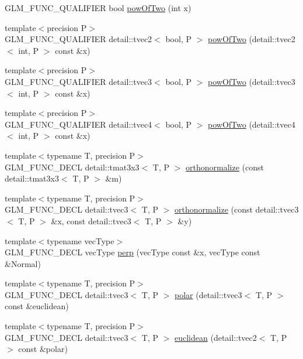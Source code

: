 \begin{CompactItemize}
\item 
GLM\_\-FUNC\_\-QUALIFIER bool \hyperlink{group__gtx__optimum__pow_g399b24df28267c1f061c462dd359affd}{powOfTwo} (int x)
\item 
{\footnotesize template$<$precision P$>$ }\\GLM\_\-FUNC\_\-QUALIFIER detail::tvec2$<$ bool, P $>$ \hyperlink{group__gtx__optimum__pow_g9eb230332816fecf06fc3a6f01fcaffa}{powOfTwo} (detail::tvec2$<$ int, P $>$ const \&x)
\item 
{\footnotesize template$<$precision P$>$ }\\GLM\_\-FUNC\_\-QUALIFIER detail::tvec3$<$ bool, P $>$ \hyperlink{group__gtx__optimum__pow_g9225089c241c18df4ff3548949f8d223}{powOfTwo} (detail::tvec3$<$ int, P $>$ const \&x)
\item 
{\footnotesize template$<$precision P$>$ }\\GLM\_\-FUNC\_\-QUALIFIER detail::tvec4$<$ bool, P $>$ \hyperlink{group__gtx__optimum__pow_g6b8d2e72de216fdb517d7bcc9323a713}{powOfTwo} (detail::tvec4$<$ int, P $>$ const \&x)
\item 
{\footnotesize template$<$typename T, precision P$>$ }\\GLM\_\-FUNC\_\-DECL detail::tmat3x3$<$ T, P $>$ \hyperlink{group__gtx__orthonormalize_ge0c06d8312a13b38747271ea68f00121}{orthonormalize} (const detail::tmat3x3$<$ T, P $>$ \&m)
\item 
{\footnotesize template$<$typename T, precision P$>$ }\\GLM\_\-FUNC\_\-DECL detail::tvec3$<$ T, P $>$ \hyperlink{group__gtx__orthonormalize_g6e5ecb7642087e4ff470c8f068c903be}{orthonormalize} (const detail::tvec3$<$ T, P $>$ \&x, const detail::tvec3$<$ T, P $>$ \&y)
\item 
{\footnotesize template$<$typename vecType$>$ }\\GLM\_\-FUNC\_\-DECL vecType \hyperlink{group__gtx__perpendicular_gcd6201d43400cf027df57552bf92301d}{perp} (vecType const \&x, vecType const \&Normal)
\item 
{\footnotesize template$<$typename T, precision P$>$ }\\GLM\_\-FUNC\_\-DECL detail::tvec3$<$ T, P $>$ \hyperlink{group__gtx__polar__coordinates_g65a075c52ee1c699d77c4a98dd266006}{polar} (detail::tvec3$<$ T, P $>$ const \&euclidean)
\item 
{\footnotesize template$<$typename T, precision P$>$ }\\GLM\_\-FUNC\_\-DECL detail::tvec3$<$ T, P $>$ \hyperlink{group__gtx__polar__coordinates_g3bd21c0f1b1d99a2f8e9cfc85bca488e}{euclidean} (detail::tvec2$<$ T, P $>$ const \&polar)

\end{CompactItemize}
